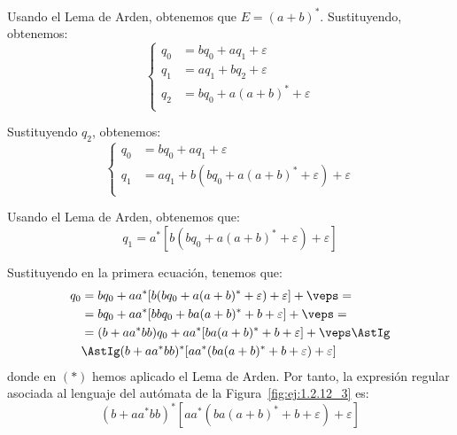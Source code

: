 \begin{ejercicio}
\begin{enumerate}
        Usando el Lema de Arden, obtenemos que $E=(a+b)^*$. Sustituyendo, obtenemos:
        \begin{equation*}
            \begin{cases}
                q_0 &= bq_0 + aq_1 + \varepsilon\\
                q_1 &= aq_1 + bq_2 + \varepsilon\\
                q_2 &= bq_0 + a(a+b)^* + \varepsilon\\
            \end{cases}
        \end{equation*}

        Sustituyendo $q_2$, obtenemos:
        \begin{equation*}
            \begin{cases}
                q_0 &= bq_0 + aq_1 + \varepsilon\\
                q_1 &= aq_1 + b(bq_0 + a(a+b)^* + \varepsilon) + \varepsilon\\
            \end{cases}
        \end{equation*}

        Usando el Lema de Arden, obtenemos que:
        \begin{equation*}
            q_1 = a^*[b(bq_0 + a(a+b)^* + \varepsilon) + \varepsilon]
        \end{equation*}

        Sustituyendo en la primera ecuación, tenemos que:
        \begin{align*}
            q_0 &= bq_0 +aa^*[b(bq_0 + a(a+b)^* + \varepsilon) + \varepsilon] + \veps=\\
            &= bq_0 + aa^*[bbq_0 + ba(a+b)^* + b + \varepsilon] + \veps =\\
            &= (b+aa^*bb)q_0 + aa^*[ba(a+b)^* + b + \varepsilon] + \veps \AstIg\\
            &\AstIg (b+aa^*bb)^*[aa^*(ba(a+b)^* + b + \varepsilon)+\varepsilon]
        \end{align*}
        donde en $(\ast)$ hemos aplicado el Lema de Arden.
        Por tanto, la expresión regular asociada al lenguaje del autómata de la Figura~\ref{fig:ej:1.2.12_3} es:
        \begin{equation*}
            (b+aa^*bb)^*[aa^*(ba(a+b)^* + b + \varepsilon)+\varepsilon]
        \end{equation*}
    \end{enumerate}
\end{ejercicio}

